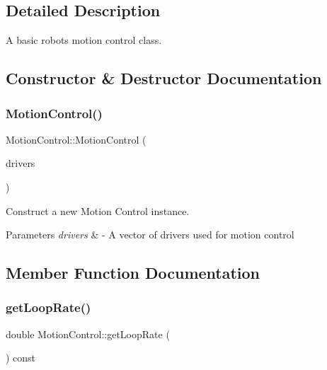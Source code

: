 \subsection{Detailed Description}
A basic robot\textquotesingle{}s motion control class. 

\subsection{Constructor \& Destructor Documentation}
\mbox{\label{classMotionControl_ae59561bd3b5a703377c3d905d6bcf0ac}} 
\subsubsection{\texorpdfstring{Motion\+Control()}{MotionControl()}}
{\footnotesize\ttfamily Motion\+Control\+::\+Motion\+Control (\begin{DoxyParamCaption}\item[{const std\+::vector$<$ \hyperlink{classBasicRobotHW}{Basic\+Robot\+HW} $\ast$$>$ \&}]{drivers }\end{DoxyParamCaption})\hspace{0.3cm}{\ttfamily [explicit]}}



Construct a new Motion Control instance. 


\begin{DoxyParams}{Parameters}
{\em drivers} & -\/ A vector of drivers used for motion control \\
\hline
\end{DoxyParams}


\subsection{Member Function Documentation}
\mbox{\label{classMotionControl_aa54a9d8ce253dce201af950a2d7c12b5}} 
\subsubsection{\texorpdfstring{get\+Loop\+Rate()}{getLoopRate()}}
{\footnotesize\ttfamily double Motion\+Control\+::get\+Loop\+Rate (\begin{DoxyParamCaption}{ }\end{DoxyParamCaption}) const}



